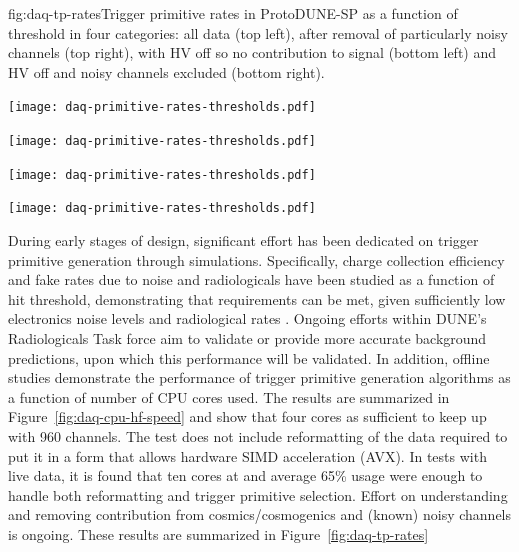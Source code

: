 \begin{dunefigure}{fig:daq-tp-rates}{Trigger primitive rates in ProtoDUNE-SP as
    a function of threshold in four categories: all data (top left), after
    removal of particularly noisy channels (top right), with HV off so no
    contribution to signal (bottom left) and HV off and noisy channels excluded
    (bottom right). }
  \begin{minipage}[b]{0.5\linewidth}
    \begin{center}
      \texttt{[image: daq-primitive-rates-thresholds.pdf]}

      \texttt{[image: daq-primitive-rates-thresholds.pdf]}
    \end{center}
  \end{minipage}%
  \begin{minipage}[b]{0.5\linewidth}
    \begin{center}
      \texttt{[image: daq-primitive-rates-thresholds.pdf]}

      \texttt{[image: daq-primitive-rates-thresholds.pdf]}
    \end{center}
  \end{minipage}

\end{dunefigure}


During early stages of design, significant effort has been dedicated on
trigger primitive generation through simulations.
Specifically, charge collection efficiency and fake rates due to noise
and radiologicals have been studied as a function of hit threshold,
demonstrating that requirements can be met, given sufficiently low
electronics noise levels and radiological rates \cite{ref}.
Ongoing efforts within DUNE's Radiologicals Task force aim to validate
or provide more accurate background predictions, upon which this
performance will be validated.
In addition, offline studies demonstrate the performance of trigger
primitive generation algorithms as a function of number of CPU cores
used.  
The results are summarized in Figure~\ref{fig:daq-cpu-hf-speed} and show
that four cores as sufficient to keep up with 960 channels.
The test does not include reformatting of the data required to put it in
a form that allows hardware SIMD acceleration (AVX).  
In tests with live  data, it is found that ten cores at
and average 65\% usage were enough to handle both reformatting and
trigger primitive selection. 
Effort on understanding and removing contribution from
cosmics/cosmogenics and (known) noisy channels is ongoing.
These results are summarized in Figure~\ref{fig:daq-tp-rates}

